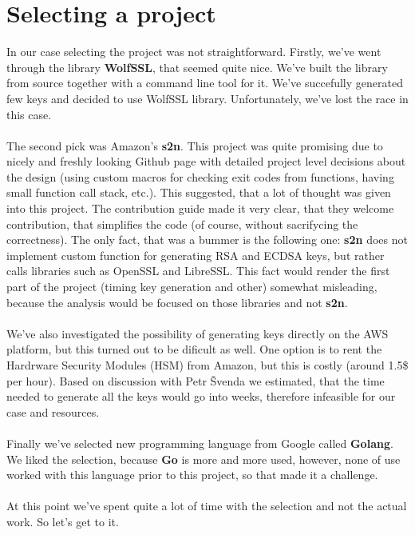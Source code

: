 \documentclass[a4paper]{scrartcl}
\subtitle{}
\begin{document}
\section{Selecting a project}
In our case selecting the project was not straightforward. Firstly, we've went through the library \textbf{WolfSSL}, that seemed quite nice. We've built the library from source together with a command line tool for it. We've succefully generated few keys and decided to use WolfSSL library. Unfortunately, we've lost the race in this case.
\\\\
The second pick was Amazon's \textbf{s2n}. This project was quite promising due to nicely and freshly looking Github page with detailed project level decisions about the design (using custom macros for checking exit codes from functions, having small function call stack, etc.). This suggested, that a lot of thought was given into this project. The contribution guide made it very clear, that they welcome contribution, that simplifies the code (of course, without sacrifycing the correctness). The only fact, that was a bummer is the following one: \textbf{s2n} does not implement custom function for generating RSA and ECDSA keys, but rather calls libraries such as OpenSSL and LibreSSL. This fact would render the first part of the project (timing key generation and other) somewhat misleading, because the analysis would be focused on those libraries and not \textbf{s2n}.
\\\\
We've also investigated the possibility of generating keys directly on the AWS platform, but this turned out to be dificult as well. One option is to rent the Hardrware Security Modules (HSM) from Amazon, but this is costly (around 1.5\$ per hour). Based on discussion with Petr Švenda we estimated, that the time needed to generate all the keys would go into weeks, therefore infeasible for our case and resources.
\\\\
Finally we've selected new programming language from Google called \textbf{Golang}. We liked the selection, because \textbf{Go} is more and more used, however, none of use worked with this language prior to this project, so that made it a challenge.
\\\\
At this point we've spent quite a lot of time with the selection and not the actual work. So let's get to it.
\end{document}
